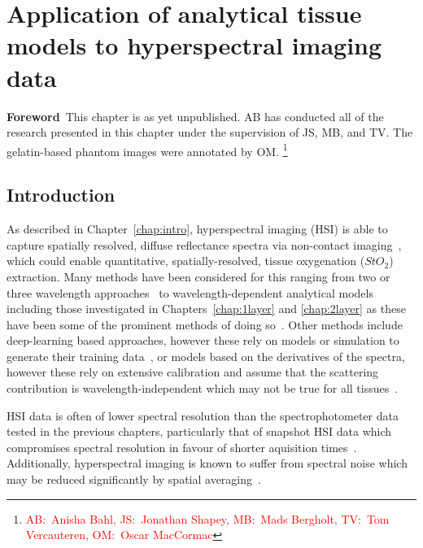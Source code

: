 \chapter[Application of models to HSI data]{Application of analytical tissue models to hyperspectral imaging data}\label{chap:HSImodel}
\begin{center}
\begin{minipage}[b]{0.9\linewidth}
\small
\textbf{Foreword\,}
This chapter is as yet unpublished. 
\newline
AB has conducted all of the research presented in this chapter under the supervision of JS, MB, and TV. The gelatin-based phantom images were annotated by OM. \footnote{\textcolor{red}{AB:~Anisha Bahl, JS:~Jonathan Shapey, MB:~Mads Bergholt, TV:~Tom Vercauteren, OM:~Oscar MacCormac}}
\end{minipage}
\end{center}

\minitoc

\section{Introduction}
As described in Chapter~\ref{chap:intro}, hyperspectral imaging (HSI) is able to capture spatially resolved, diffuse reflectance spectra via non-contact imaging~\citep{Lu2014,Giannoni2018,Calin2014,Shapey2019}, which could enable quantitative, spatially-resolved, tissue oxygenation ($StO_2$) extraction. Many methods have been considered for this ranging from two or three wavelength approaches~\citep{MacKenzie2018} to wavelength-dependent analytical models including those investigated in Chapters~\ref{chap:1layer} and \ref{chap:2layer} as these have been some of the prominent methods of doing so~\citep{Yudovsky2009, Jacques1999, Clancy2015, Clancy2020}. Other methods include deep-learning based approaches, however these rely on models or simulation to generate their training data~\citep{Wirkert2016}, or models based on the derivatives of the spectra, however these rely on extensive calibration and assume that the scattering contribution is wavelength-independent which may not be true for all tissues~\citep{Holmer2018, Jacques2013}.

HSI data is often of lower spectral resolution than the spectrophotometer data tested in the previous chapters, particularly that of snapshot HSI data which compromises spectral resolution in favour of shorter aquisition times~\citep{Geelen2014}. Additionally, hyperspectral imaging is known to suffer from spectral noise which may be reduced significantly by spatial averaging~\citep{Zhang2020}.

